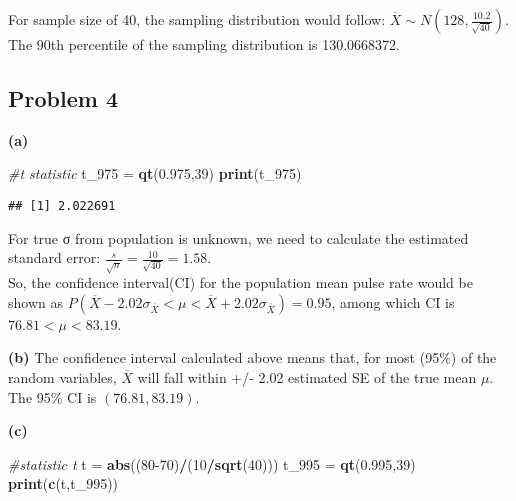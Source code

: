 \documentclass[
]{article}
\newenvironment{Shaded}{\begin{snugshade}}{\end{snugshade}}
\newcommand{\CommentTok}[1]{\textcolor[rgb]{0.56,0.35,0.01}{\textit{#1}}}
\newcommand{\DecValTok}[1]{\textcolor[rgb]{0.00,0.00,0.81}{#1}}
\newcommand{\FloatTok}[1]{\textcolor[rgb]{0.00,0.00,0.81}{#1}}
\newcommand{\FunctionTok}[1]{\textcolor[rgb]{0.13,0.29,0.53}{\textbf{#1}}}
\newcommand{\NormalTok}[1]{#1}
\newcommand{\OtherTok}[1]{\textcolor[rgb]{0.56,0.35,0.01}{#1}}
\newcommand{\SpecialCharTok}[1]{\textcolor[rgb]{0.81,0.36,0.00}{\textbf{#1}}}
\begin{document}
For sample size of 40, the sampling distribution would follow:
\(\overline{X}\sim N(128,\frac{10.2}{\sqrt{40}})\). The 90th percentile
of the sampling distribution is 130.0668372.

\hypertarget{problem-4}{%
\subsection{Problem 4}\label{problem-4}}

\textbf{(a)}

\begin{Shaded}
\begin{Highlighting}[]
\CommentTok{\#t statistic}
\NormalTok{t\_975 }\OtherTok{=} \FunctionTok{qt}\NormalTok{(}\FloatTok{0.975}\NormalTok{,}\DecValTok{39}\NormalTok{)}
\FunctionTok{print}\NormalTok{(t\_975)}
\end{Highlighting}
\end{Shaded}

\begin{verbatim}
## [1] 2.022691
\end{verbatim}

For true σ from population is unknown, we need to calculate the
estimated standard error:
\(\frac{s}{\sqrt{n}}=\frac{10}{\sqrt{40}}=1.58\).\\
So, the confidence interval(CI) for the population mean pulse rate would
be shown as
\(P(\overline{X}-2.02\sigma_{\overline{X}}<\mu<\overline{X}+2.02\sigma_{\overline{X}}) = 0.95\),
among which CI is \textbf{\(76.81<\mu<83.19\)}.

\textbf{(b)} The confidence interval calculated above means that, for
most (95\%) of the random variables, \(\overline{X}\) will fall within
+/- 2.02 estimated SE of the true mean \(\mu\). The 95\% CI is
\((76.81,83.19)\).

\textbf{(c)}

\begin{Shaded}
\begin{Highlighting}[]
\CommentTok{\#statistic t}
\NormalTok{t }\OtherTok{=} \FunctionTok{abs}\NormalTok{((}\DecValTok{80{-}70}\NormalTok{)}\SpecialCharTok{/}\NormalTok{(}\DecValTok{10}\SpecialCharTok{/}\FunctionTok{sqrt}\NormalTok{(}\DecValTok{40}\NormalTok{)))}
\NormalTok{t\_995 }\OtherTok{=} \FunctionTok{qt}\NormalTok{(}\FloatTok{0.995}\NormalTok{,}\DecValTok{39}\NormalTok{)}
\FunctionTok{print}\NormalTok{(}\FunctionTok{c}\NormalTok{(t,t\_995))}
\end{Highlighting}
\end{Shaded}
\end{document}
